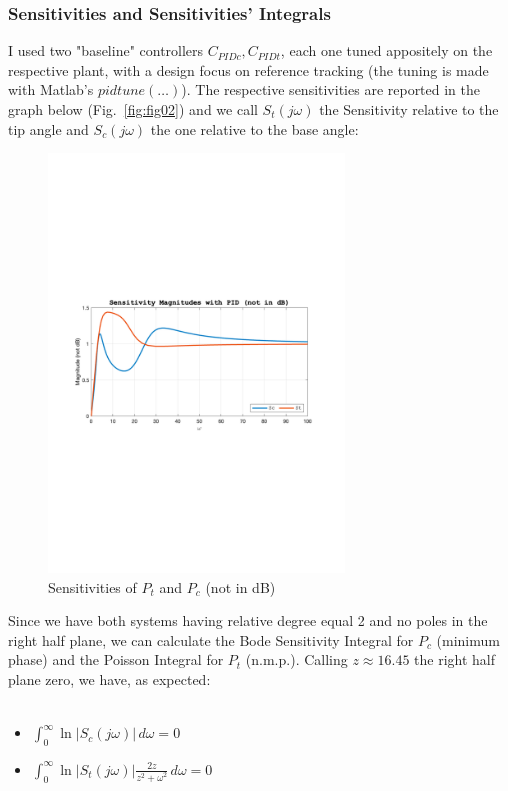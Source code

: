 \documentclass[a4paper, 12pt]{article}
\def\FigureThree{\centering\includegraphics[width=0.7\textwidth]{Figures/fig03.pdf}}
\begin{document}
\subsubsection{Sensitivities and Sensitivities' Integrals}
I used two "baseline" controllers $C_{PIDc},C_{PIDt}$, each one tuned appositely on the respective plant, with a design focus on reference tracking (the tuning is made with Matlab's $pidtune(\dots)$).
The respective sensitivities are reported in the graph below (Fig.~\ref{fig:fig02}) and we call $S_t(j\omega)$ the Sensitivity relative to the tip angle and $S_c(j\omega)$ the one relative to the base angle: 
\begin{figure}[h!]
    \FigureThree
    \caption{Sensitivities of $P_t$ and $P_c$ (not in dB)}
    \label{fig:fig03}
\end{figure}
Since we have both systems having relative degree equal 2 and no poles in the right half plane, we can calculate the Bode Sensitivity Integral for $P_c$ (minimum phase) and the Poisson Integral for $P_t$ (n.m.p.). Calling $z \approx 16.45$ the right half plane zero, we have, as expected:
\\\\
\begin{itemize}
    \item $\int_{0}^{\infty} \ln \left| S_c(j\omega) \right| \, d\omega = 0$
    \item $\int_{0}^{\infty} \ln \left| S_t(j\omega) \right|\frac{2z}{z^2+\omega^2} \, d\omega = 0$
\end{itemize}
\end{document}
